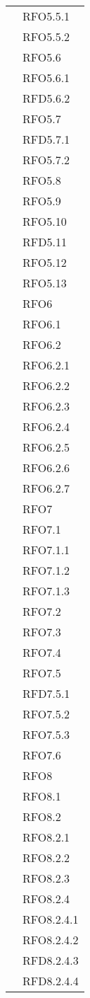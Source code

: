 \begin{longtable}{ p{12cm} | p{4cm} }
			&RFO5.5.1\\
			&RFO5.5.2\\
			&RFO5.6\\
			&RFO5.6.1\\
			&RFD5.6.2\\
			&RFO5.7\\
			&RFD5.7.1\\
			&RFO5.7.2\\
			&RFO5.8\\
			&RFO5.9\\
			&RFO5.10\\
			&RFD5.11\\
			&RFO5.12\\
			&RFO5.13\\
			&RFO6\\
			&RFO6.1\\
			&RFO6.2\\
			&RFO6.2.1\\
			&RFO6.2.2\\
			&RFO6.2.3\\
			&RFO6.2.4\\
			&RFO6.2.5\\
			&RFO6.2.6\\
			&RFO6.2.7\\
			&RFO7\\
			&RFO7.1\\
			&RFO7.1.1\\
			&RFO7.1.2\\
			&RFO7.1.3\\
			&RFO7.2\\
			&RFO7.3\\
			&RFO7.4\\
			&RFO7.5\\
			&RFD7.5.1\\
			&RFO7.5.2\\
			&RFO7.5.3\\
			&RFO7.6\\
			&RFO8\\
			&RFO8.1\\
			&RFO8.2\\
			&RFO8.2.1\\
			&RFO8.2.2\\
			&RFO8.2.3\\
			&RFO8.2.4\\
			&RFO8.2.4.1\\
			&RFO8.2.4.2\\
			&RFD8.2.4.3\\
			&RFD8.2.4.4\\

\end{longtable}
